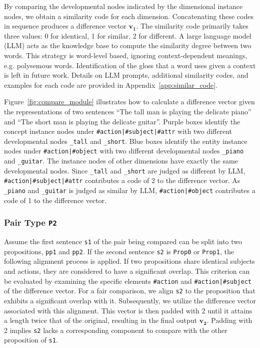 By comparing the developmental nodes indicated by the dimensional instance nodes, we obtain a similarity code for each dimension. Concatenating these codes in sequence produces a difference vector $\mathbf{v_1}$. The similarity code primarily takes three values: 0 for identical, 1 for similar, 2 for different. A large language model (LLM) acts as the knowledge base to compute the similarity degree between two words. This strategy is word-level based, ignoring context-dependent meanings, e.g. polysemous words. Identification of the gloss that a word uses given a context is left in future work. Details on LLM prompts, additional similarity codes, and examples for each code are provided in Appendix~\ref{app:similar_code}.

Figure~\ref{fig:compare_module} illustrates how to calculate a difference vector given the representations of two sentences ``The tall man is playing the delicate piano'' and ``The short man is playing the delicate guitar''. Purple boxes identify the concept instance nodes under \texttt{\#action|\#subject|\#attr} with two different developmental nodes \texttt{\_tall} and \texttt{\_short}. Blue boxes identify the entity instance nodes under \texttt{\#action|\#object} with two different developmental nodes \texttt{\_piano} and \texttt{\_guitar}. The instance nodes of other dimensions have exactly the same developmental nodes. Since \texttt{\_tall} and \texttt{\_short} are judged as different by LLM, \texttt{\#action|\#subject|\#attr} contributes a code of 2 to the difference vector. As \texttt{\_piano} and \texttt{\_guitar} is judged as similar by LLM, \texttt{\#action|\#object} contributes a code of 1 to the difference vector. 


\subsubsection{Pair Type \texttt{P2}}
Assume the first sentence \texttt{s1} of the pair being compared can be split into two propositions, \texttt{pp1} and \texttt{pp2}. If the second sentence \texttt{s2} is \texttt{Prop0} or \texttt{Prop1}, the following alignment process is applied. If two propositions share identical subjects and actions, they are considered to have a significant overlap. This criterion can be evaluated by examining the specific elements \texttt{\#action} and \texttt{\#action|\#subject} of the difference vector. For a fair comparison, we align \texttt{s2} to the proposition that exhibits a significant overlap with it. Subsequently, we utilize the difference vector associated with this alignment. This vector is then padded with 2 until it attains a length twice that of the original, resulting in the final output $\mathbf{v_2}$. Padding with 2 implies \texttt{s2} lacks a corresponding component to compare with the other proposition of \texttt{s1}.

